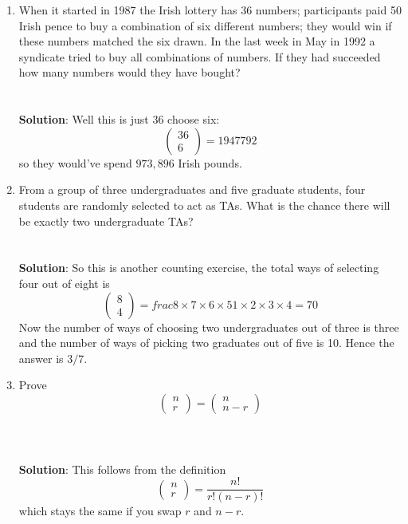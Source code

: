 \documentclass[11pt,a4paper]{scrartcl}
\begin{document}
\begin{enumerate}


\item When it started in 1987 the Irish lottery has 36 numbers;
  participants paid 50 Irish pence to buy a combination of six
  different numbers; they would win if these numbers matched the six
  drawn. In the last week in May in 1992 a syndicate tried to buy all
  combinations of numbers. If they had succeeded how many numbers
  would they have bought?\\ \\ \\ \textbf{Solution}: Well this is just 36 choose six:
\begin{equation}
\left(\begin{array}{c}36\\6\end{array}\right)=1947792
\end{equation}
so they would've spend $973,896$ Irish pounds.


\item From a group of three undergraduates and five graduate students,
  four students are randomly selected to act as TAs. What is the
  chance there will be exactly two undergraduate
  TAs?\\ \\ \\ \textbf{Solution}: So this is another counting exercise,
  the total ways of selecting four out of eight is
\begin{equation}
\left(\begin{array}{c}8\\4\end{array}\right)=frac{8\times 7\times 6 \times 5}{1\times 2\times 3\times 4}
=70
\end{equation}
Now the number of ways of choosing two undergraduates out of three is
three and the number of ways of picking two graduates out of five is
10. Hence the answer is $3/7$.

\item Prove
\begin{equation}
\left(\begin{array}{c}n\\r\end{array}\right)=\left(\begin{array}{c}n\\n-r\end{array}\right)
\end{equation}
\\ \\ \\ \textbf{Solution}: This follows from the definition
\begin{equation}
\left(\begin{array}{c}n\\r\end{array}\right)=\frac{n!}{r!(n-r)!}
\end{equation}
which stays the same if you swap $r$ and $n-r$.


\end{enumerate}
\end{document}
